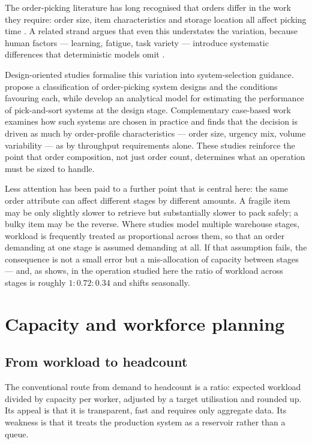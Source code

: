 The order-picking literature has long recognised that orders differ in the work they require:
order size, item characteristics and storage location all affect picking time
\citep{dekoster2007,chan2011}. A related strand argues that even this understates the variation,
because human factors --- learning, fatigue, task variety --- introduce systematic differences
that deterministic models omit \citep{grosse2014}.

Design-oriented studies formalise this variation into system-selection guidance.
\citet{dallari2008} propose a classification of order-picking system designs and the conditions
favouring each, while \citet{marchet2011} develop an analytical model for estimating the
performance of pick-and-sort systems at the design stage. Complementary case-based work
\citep{marchet2014} examines how such systems are chosen in practice and finds that the decision
is driven as much by order-profile characteristics --- order size, urgency mix, volume
variability --- as by throughput requirements alone. These studies reinforce the point that
order composition, not just order count, determines what an operation must be sized to handle.

Less attention has been paid to a further point that is central here: the same order attribute
can affect different stages by different amounts. A fragile item may be only slightly slower to
retrieve but substantially slower to pack safely; a bulky item may be the reverse. Where studies
model multiple warehouse stages, workload is frequently treated as proportional across them, so
that an order demanding at one stage is assumed demanding at all. If that assumption fails, the
consequence is not a small error but a mis-allocation of capacity between stages --- and, as
 shows, in the operation studied here the ratio of workload across stages
is roughly \(1 : 0.72 : 0.34\) and shifts seasonally.

\section{Capacity and workforce planning}
\label{sec:lit-capacity}

\subsection{From workload to headcount}

The conventional route from demand to headcount is a ratio: expected workload divided by
capacity per worker, adjusted by a target utilisation and rounded up. Its appeal is that it is
transparent, fast and requires only aggregate data. Its weakness is that it treats the
production system as a reservoir rather than a queue.

